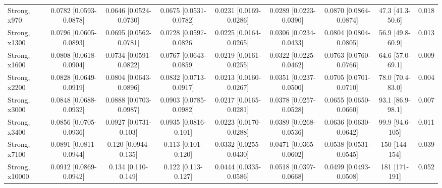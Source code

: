 \begin{tabular}{lcccccccc}
Strong, x970 & 0.0782 {\scriptsize[0.0593-0.0878]} & 0.0646 {\scriptsize[0.0524-0.0730]} & 0.0675 {\scriptsize[0.0531-0.0782]} & 0.0231 {\scriptsize[0.0169-0.0286]} & 0.0289 {\scriptsize[0.0223-0.0390]} & 0.0870 {\scriptsize[0.0864-0.0874]} & 47.3 {\scriptsize[41.3-50.6]} & 0.018 \\
Strong, x1300 & 0.0796 {\scriptsize[0.0605-0.0893]} & 0.0695 {\scriptsize[0.0562-0.0781]} & 0.0728 {\scriptsize[0.0597-0.0826]} & 0.0225 {\scriptsize[0.0164-0.0265]} & 0.0306 {\scriptsize[0.0234-0.0433]} & 0.0804 {\scriptsize[0.0804-0.0805]} & 56.9 {\scriptsize[49.8-60.9]} & 0.013 \\
Strong, x1600 & 0.0808 {\scriptsize[0.0618-0.0904]} & 0.0734 {\scriptsize[0.0591-0.0822]} & 0.0767 {\scriptsize[0.0643-0.0859]} & 0.0219 {\scriptsize[0.0161-0.0255]} & 0.0322 {\scriptsize[0.0225-0.0462]} & 0.0763 {\scriptsize[0.0760-0.0766]} & 64.6 {\scriptsize[57.0-69.1]} & 0.009 \\
Strong, x2200 & 0.0828 {\scriptsize[0.0649-0.0919]} & 0.0804 {\scriptsize[0.0643-0.0896]} & 0.0832 {\scriptsize[0.0713-0.0917]} & 0.0213 {\scriptsize[0.0160-0.0267]} & 0.0351 {\scriptsize[0.0237-0.0500]} & 0.0705 {\scriptsize[0.0701-0.0710]} & 78.0 {\scriptsize[70.4-83.0]} & 0.004 \\
Strong, x3000 & 0.0848 {\scriptsize[0.0688-0.0932]} & 0.0888 {\scriptsize[0.0703-0.0987]} & 0.0903 {\scriptsize[0.0785-0.0982]} & 0.0217 {\scriptsize[0.0165-0.0281]} & 0.0378 {\scriptsize[0.0257-0.0528]} & 0.0655 {\scriptsize[0.0650-0.0660]} & 93.1 {\scriptsize[86.9-98.1]} & 0.007 \\
Strong, x3400 & 0.0856 {\scriptsize[0.0705-0.0936]} & 0.0927 {\scriptsize[0.0731-0.103]} & 0.0935 {\scriptsize[0.0816-0.101]} & 0.0223 {\scriptsize[0.0170-0.0288]} & 0.0389 {\scriptsize[0.0268-0.0536]} & 0.0636 {\scriptsize[0.0630-0.0642]} & 99.9 {\scriptsize[94.6-105]} & 0.011 \\
Strong, x7100 & 0.0891 {\scriptsize[0.0811-0.0944]} & 0.120 {\scriptsize[0.0944-0.135]} & 0.113 {\scriptsize[0.101-0.120]} & 0.0332 {\scriptsize[0.0255-0.0430]} & 0.0471 {\scriptsize[0.0365-0.0602]} & 0.0538 {\scriptsize[0.0531-0.0545]} & 150 {\scriptsize[144-154]} & 0.039 \\
Strong, x10000 & 0.0912 {\scriptsize[0.0869-0.0942]} & 0.134 {\scriptsize[0.110-0.149]} & 0.122 {\scriptsize[0.113-0.127]} & 0.0444 {\scriptsize[0.0335-0.0586]} & 0.0518 {\scriptsize[0.0397-0.0668]} & 0.0499 {\scriptsize[0.0493-0.0508]} & 181 {\scriptsize[171-191]} & 0.052 \\
\bottomrule
\end{tabular}

